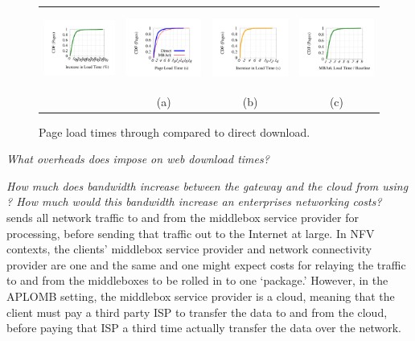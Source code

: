 \begin{figure}
  \hspace{-15pt}
  \begin{tabular}{cccc}
  \includegraphics[height=1in]{fig/cdflabel}
  &\hspace{-10pt}\includegraphics[height=1in]{fig/e2e_loadtimes}
  &\hspace{-10pt}\includegraphics[height=1in]{fig/e2e_delta_absolute}
  &\hspace{-10pt}\includegraphics[height=1in]{fig/e2e_delta_relative}
  \\
  &(a)&(b)&(c)\\
  \end{tabular}
  \vspace{-10pt}
  \caption[]{\label{fig:e2eloads} Page load times through \sys compared to direct download.}
  \vspace{-10pt}
\end{figure}
{\it What overheads does \sys impose on web download times?}

{\it How much does bandwidth increase between the gateway and the cloud from using \sys? How much would this bandwidth increase an enterprises networking costs?}
\sys sends all network traffic to and from the middlebox service provider for processing, before sending that traffic out to the Internet at large. In NFV contexts, the clients' middlebox service provider and network connectivity provider are one and the same and one might expect costs for relaying the traffic to and from the middleboxes to be rolled in to one `package.' 
However, in the APLOMB setting, the middlebox service provider is a cloud, meaning that the client must pay a third party ISP to transfer the data to and from the cloud, before paying that ISP a third time actually transfer the data over the network.

